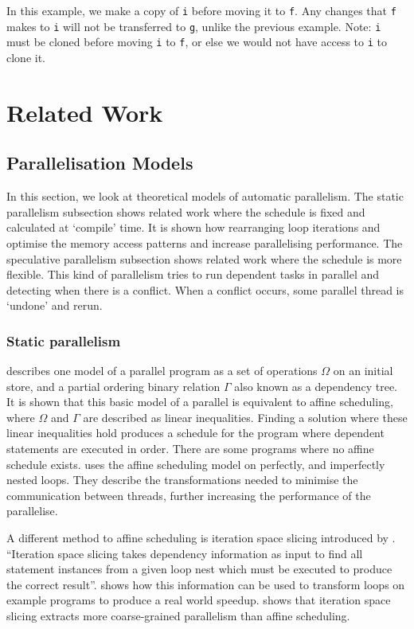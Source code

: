 \documentclass[conference]{IEEEtran}
\begin{document}
In this example, we make a copy of \texttt{i} before moving it to \texttt{f}. Any changes that \texttt{f} makes to \texttt{i} will not be transferred to \texttt{g}, unlike the previous example. Note: \texttt{i} must be cloned before moving \texttt{i} to \texttt{f}, or else we would not have access to \texttt{i} to clone it.

\section{Related Work}
\label{sec:related-work}

\subsection{Parallelisation Models}
\label{sec:related-models}
In this section, we look at theoretical models of automatic parallelism. The static parallelism subsection shows related work where the schedule is fixed and calculated at `compile' time. It is shown how rearranging loop iterations and optimise the memory access patterns and increase parallelising performance. The speculative parallelism subsection shows related work where the schedule is more flexible. This kind of parallelism tries to run dependent tasks in parallel and detecting when there is a conflict. When a conflict occurs, some parallel thread is `undone' and rerun.

\subsubsection{Static parallelism}
\textcite{Feautrier1992,Feautrier1992a} describes one model of a parallel program as a set of operations $\Omega$ on an initial store, and a partial ordering binary relation $\Gamma$ also known as a dependency tree. It is shown that this basic model of a parallel is equivalent to affine scheduling, where $\Omega$ and $\Gamma$ are described as linear inequalities. Finding a solution where these linear inequalities hold produces a schedule for the program where dependent statements are executed in order. There are some programs where no affine schedule exists.
\textcite{Bondhugula2008} uses the affine scheduling model on perfectly, and imperfectly nested loops. They describe the transformations needed to minimise the communication between threads, further increasing the performance of the parallelise.

A different method to affine scheduling is iteration space slicing introduced by \textcite{Pugh1997}. ``Iteration space slicing takes dependency information as input to find all statement instances from a given loop nest which must be executed to produce the correct result''. \textcite{Pugh1997} shows how this information can be used to transform loops on example programs to produce a real world speedup. \textcite{Beletska2011} shows that iteration space slicing extracts more coarse-grained parallelism than affine scheduling.
\end{document}
